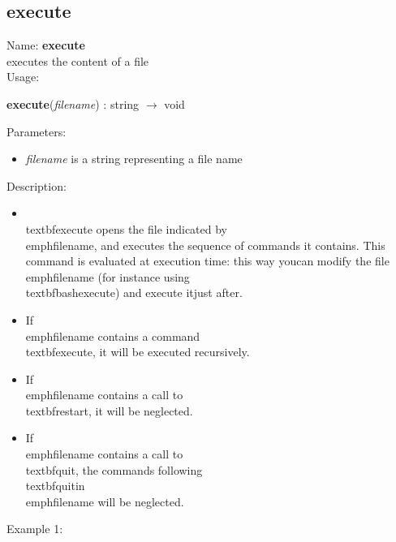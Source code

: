 \subsection{execute}
\label{labexecute}
\noindent Name: \textbf{execute}\\
executes the content of a file\\
\noindent Usage: 
\begin{center}
\textbf{execute}(\emph{filename}) : \textsf{string} $\rightarrow$ \textsf{void}\\
\end{center}
Parameters: 
\begin{itemize}
\item \emph{filename} is a string representing a file name
\end{itemize}
\noindent Description: \begin{itemize}

\item \\textbf{execute} opens the file indicated by \\emph{filename}, and executes the sequence of \n   commands it contains. This command is evaluated at execution time: this way you\n   can modify the file \\emph{filename} (for instance using \\textbf{bashexecute}) and execute it\n   just after.\n
\item If \\emph{filename} contains a command \\textbf{execute}, it will be executed recursively.\n
\item If \\emph{filename} contains a call to \\textbf{restart}, it will be neglected.\n
\item If \\emph{filename} contains a call to \\textbf{quit}, the commands following \\textbf{quit}\n   in \\emph{filename} will be neglected.\n\end{itemize}
\noindent Example 1: 
\begin{center}\begin{minipage}{15cm}\begin{Verbatim}[frame=single]
\end{Verbatim}
\end{minipage}\end{center}
